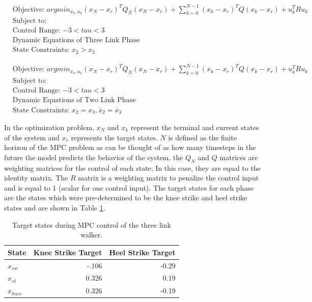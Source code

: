 \documentclass{./springer/svjour3}
\begin{document}
\begin{equation}
  \begin{aligned}
  &\text{Objective: $arg min_{x_k,u_k} (x_N - x_r)^TQ_N(x_N - x_r) + \sum_{k = 0}^{N-1} (x_k - x_r)^TQ(x_k - x_r) + u_k^TRu_k $}\\
  &\text{Subject to:}\\
  &\text{Control Range: $-3 < tau < 3$}\\
  &\text{Dynamic Equations of Three Link Phase}\\
  &\text{State Constraints: $x_2 > x_3 $}
  \end{aligned}
  \label{eq:threelinkphaseopt}
\end{equation}

\begin{equation}
  \begin{aligned}
  &\text{Objective: $arg min_{x_k,u_k} (x_N - x_r)^TQ_N(x_N - x_r) + \sum_{k = 0}^{N-1} (x_k - x_r)^TQ(x_k - x_r) + u_k^TRu_k $}\\
  &\text{Subject to:}\\
  &\text{Control Range: $-3 < tau < 3$}\\
  &\text{Dynamic Equations of Two Link Phase}\\
  &\text{State Constraints: $x_2 = x_3, \dot{x_2} = \dot{x_3}$}
  \end{aligned}
  \label{eq:twolinkphaseopt}
\end{equation}

In the optimization problem, $x_N$ and $x_k$ represent the terminal and current states of the system and $x_r$ represents the target states.
$N$ is defined as the finite horizon of the MPC problem as can be thought of as how many timesteps in the future the model predicts the behavior of the system.
the $Q_N$ and $Q$ matrices are weighting matrices for the control of each state; In this case, they are equal to the identity matrix.
The $R$ matrix is a weighting matrix to penalize the control input and is equal to 1 (scalar for one control input).
The target states for each phase are the states which were pre-determined to be the knee strike and heel strike states and are shown in Table \ref{tab:threelegterm}.

\begin{table}[h]
  \centering
  \caption{Target states during MPC control of the three link walker.}
  \begin{tabular}{lrr}
  \toprule
  State & Knee Strike Target & Heel Strike Target\\
  \midrule
  $x_{sw}$ & -.106  & -0.29\\
  $x_{st}$ & 0.326 & 0.19\\
  $x_{knee}$ & 0.326 & -0.19\\
  \end{tabular}
  \label{tab:threelegterm}
\end{table}
\end{document}
